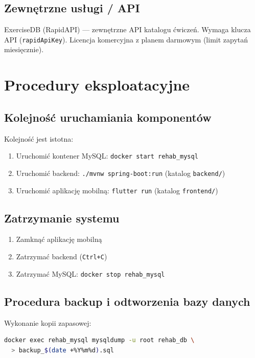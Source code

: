 \documentclass[12pt,a4paper]{article}
\begin{document}
\subsection{Zewnętrzne usługi / API}

ExerciseDB (RapidAPI) --- zewnętrzne API katalogu ćwiczeń. Wymaga klucza API (\texttt{rapidApiKey}). Licencja komercyjna z planem darmowym (limit zapytań miesięcznie).

\section{Procedury eksploatacyjne}

\subsection{Kolejność uruchamiania komponentów}

Kolejność jest istotna:
\begin{enumerate}
  \item Uruchomić kontener MySQL: \texttt{docker start rehab\_mysql}
  \item Uruchomić backend: \texttt{./mvnw spring-boot:run} (katalog \texttt{backend/})
  \item Uruchomić aplikację mobilną: \texttt{flutter run} (katalog \texttt{frontend/})
\end{enumerate}

\subsection{Zatrzymanie systemu}

\begin{enumerate}
  \item Zamknąć aplikację mobilną
  \item Zatrzymać backend (\texttt{Ctrl+C})
  \item Zatrzymać MySQL: \texttt{docker stop rehab\_mysql}
\end{enumerate}

\subsection{Procedura backup i odtworzenia bazy danych}

Wykonanie kopii zapasowej:
\begin{lstlisting}[language=bash, caption={Kopia zapasowa bazy danych}]
docker exec rehab_mysql mysqldump -u root rehab_db \
  > backup_$(date +%Y%m%d).sql
\end{lstlisting}
\end{document}
